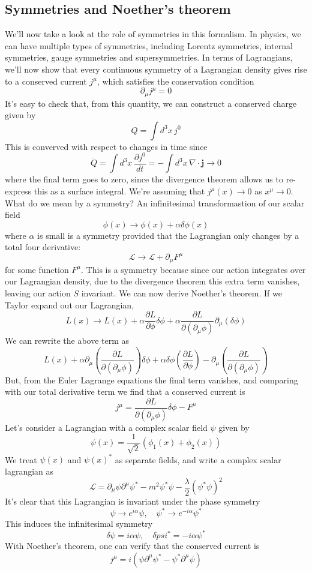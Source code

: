 \documentclass[11pt, oneside]{article}   	%
\theoremstyle{newline}
\theoremstyle{newline}
\theoremstyle{newline}
\theoremstyle{newline}
\theoremstyle{newline}
\begin{document}
\pagebreak 
\subsection{Symmetries and Noether's theorem}
We'll now take a look at the role of symmetries in this formalism. In physics, we can have multiple types of symmetries, including Lorentz symmetries, internal symmetries, gauge symmetries and supersymmetries. In terms of Lagrangians, we'll now show that every continuous symmetry of a Lagrangian density gives rise to a conserved current $j^\mu$, which satisfies the conservation condition 
\[ 
\partial_\mu j^\mu = 0 
\]
It's easy to check that, from this quantity, we can construct a conserved charge given by 
\[ 
Q = \int d^3 x \, j^0 
\] 
This is converved with respect to changes in time since 
\[ 
\dot Q = \int d^3 x \, \frac{ \partial j^0 }{ dt }  =  - \int d^3 x \, \nabla \cdot \mathbf{ j } \rightarrow 0 
\] 
where the final term goes to zero, since the divergence theorem allows us to re-express this as a surface integral. We're assuming that $j^\mu (x) \rightarrow 0 $ as $ x^\mu \rightarrow 0$. 
What do we mean by a symmetry? An infinitesimal transformastion of our scalar field 
\[ 
\phi(x) \rightarrow \phi( x)  + \alpha \delta \phi( x) 
\] 
where $\alpha $ is small is a symmetry provided that the Lagrangian only changes by a total four derivative: 
\[ 
\mathcal{L} \rightarrow \mathcal{L } + \partial_\mu F^\mu 
\] 
for some function $F^\mu$. This is a symmetry because since our action integrates over our Lagrangian density, due to the divergence theorem this extra term vanishes, leaving our action $S$ invariant. 
We can now derive Noether's theorem. If we Taylor expand out our Lagrangian, 
\[ 
L(x) \rightarrow L(x) + \alpha \frac{ \partial L }{ \partial \phi} \delta \phi + \alpha \frac{ \partial L}{ \partial ( \partial_\mu \phi ) } \partial_\mu ( \delta \phi )  
\] 
We can rewrite the above term as 
\[ 
L (x) + \alpha \partial_\mu \left( \frac{ \partial L }{ \partial ( \partial_\mu \phi ) }\right)  \delta \phi + \alpha \delta \phi \left( \frac{ \partial L }{ \partial \phi } \right)   - \partial_\mu \left( \frac{ \partial L }{ \partial ( \partial_\mu \phi ) } \right) 
\] 
But, from the Euler Lagrange equations the final term vanishes, and comparing with our total derivative term we find that a conserved current is 
\[ 
j^\mu = \frac{ \partial L }{ \partial ( \partial_\mu \phi ) } \delta \phi  - F^\mu
\] 
Let's consider a Lagrangian with a complex scalar field $\psi$ given by 
\[ 
\psi( x)  = \frac{ 1}{ \sqrt{ 2} } ( \phi_1 ( x) + \phi_2 ( x) ) 
\] 
We treat $\psi ( x)$ and $\psi ( x)^* $ as separate fields, and write a complex scalar lagrangian as 
\[ 
\mathcal{ L } = \partial_\mu \psi \partial^\mu \psi^*  - m^2 \psi^* \psi  - \frac{ \lambda}{2} ( \psi^* \psi)^2 
\] 
It's clear that this Lagrangian is invariant under the phase symmetry 
\[ 
\psi \rightarrow e^{ i \alpha} \psi, \quad \psi^* \rightarrow e^{ - i \alpha} \psi^* 
\] 
This induces the infinitesimal symmetry 
\[ 
\delta \psi = i \alpha \psi, \quad \delta psi^*  = - i \alpha \psi^* 
\] 
With Noether's theorem, one can verify that the conserved current is 
\[ 
j^\mu  = i ( \psi \partial^\mu \psi^ * - \psi^* \partial^\mu \psi )  
\] 
\end{document}
